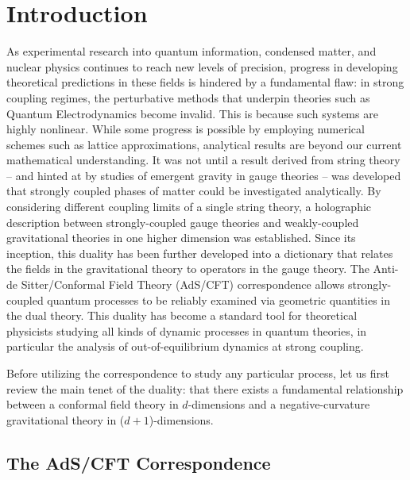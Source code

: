 \documentclass[../PhD.tex]{subfiles}
\begin{document}

\chapter{Introduction}
\label{ch: intro}

As experimental research into quantum information, condensed matter, and nuclear physics continues to reach new levels of precision, progress in developing theoretical predictions in these fields is hindered by a fundamental flaw: in strong coupling regimes, the perturbative methods that underpin theories such as Quantum Electrodynamics become invalid. This is because such systems are highly nonlinear. While some progress is possible by employing numerical schemes such as lattice approximations, analytical results are beyond our current mathematical understanding. It was not until a result derived from string theory -- and hinted at by studies of emergent gravity in gauge theories -- was developed that  strongly coupled phases of matter could be investigated analytically. By considering different coupling limits of a single string theory, a holographic description between strongly-coupled gauge theories and weakly-coupled gravitational theories in one higher dimension was established. Since its inception, this duality has been further developed into a dictionary that relates the fields in the gravitational theory to operators in the gauge theory. The Anti-de Sitter/Conformal Field Theory (AdS/CFT) correspondence allows strongly-coupled quantum processes to be reliably examined via geometric quantities in the dual theory. This duality has become a standard tool for theoretical physicists studying all kinds of dynamic processes in quantum theories, in particular the analysis of out-of-equilibrium dynamics at strong coupling.

Before utilizing the correspondence to study any particular process, let us first review the main tenet of the duality: that there exists a fundamental relationship between a conformal field theory in $d$-dimensions and a negative-curvature gravitational theory in ($d + 1$)-dimensions.


\section{The AdS/CFT Correspondence}
\label{sec: ads/cft}
\end{document}
